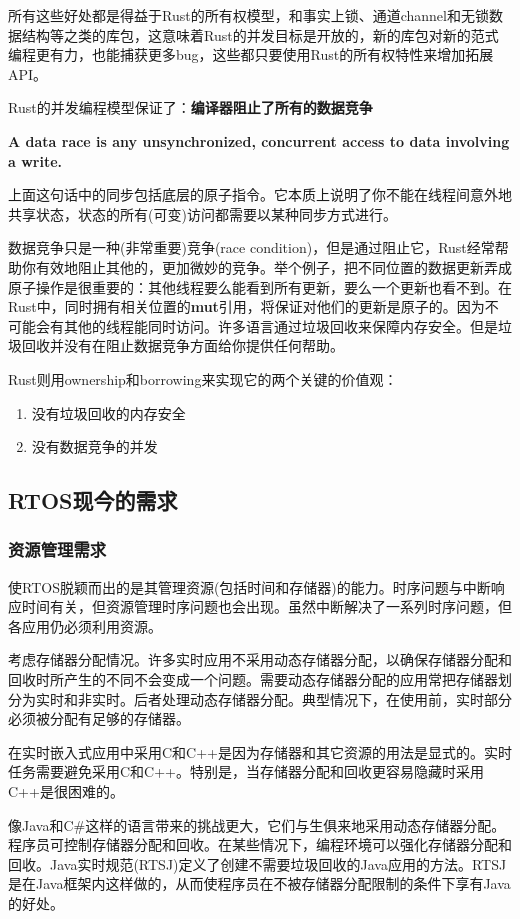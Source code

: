 \documentclass[12pt, a4paper]{article}
\begin{document}
	所有这些好处都是得益于Rust的所有权模型，和事实上锁、通道channel和无锁数据结构等之类的库包，这意味着Rust的并发目标是开放的，新的库包对新的范式编程更有力，也能捕获更多bug，这些都只要使用Rust的所有权特性来增加拓展API。
	
	Rust的并发编程模型保证了：\textbf{编译器阻止了所有的数据竞争}
	
	\textbf{A data race is any unsynchronized, concurrent access to data involving a write.}
	
	上面这句话中的同步包括底层的原子指令。它本质上说明了你不能在线程间意外地共享状态，状态的所有(可变)访问都需要以某种同步方式进行。
	
	数据竞争只是一种(非常重要)竞争(race condition)，但是通过阻止它，Rust经常帮助你有效地阻止其他的，更加微妙的竞争。举个例子，把不同位置的数据更新弄成原子操作是很重要的：其他线程要么能看到所有更新，要么一个更新也看不到。在Rust中，同时拥有相关位置的\textbf{mut}引用，将保证对他们的更新是原子的。因为不可能会有其他的线程能同时访问。许多语言通过垃圾回收来保障内存安全。但是垃圾回收并没有在阻止数据竞争方面给你提供任何帮助。
	
	Rust则用ownership和borrowing来实现它的两个关键的价值观：
	\begin{enumerate}
	\item  没有垃圾回收的内存安全
	\item  没有数据竞争的并发
	\end{enumerate}

	\subsection{RTOS现今的需求}
	\subsubsection{资源管理需求}
	使RTOS脱颖而出的是其管理资源(包括时间和存储器)的能力。时序问题与中断响应时间有关，但资源管理时序问题也会出现。虽然中断解决了一系列时序问题，但各应用仍必须利用资源。
	
	考虑存储器分配情况。许多实时应用不采用动态存储器分配，以确保存储器分配和回收时所产生的不同不会变成一个问题。需要动态存储器分配的应用常把存储器划分为实时和非实时。后者处理动态存储器分配。典型情况下，在使用前，实时部分必须被分配有足够的存储器。
	
	在实时嵌入式应用中采用C和C++是因为存储器和其它资源的用法是显式的。实时任务需要避免采用C和C++。特别是，当存储器分配和回收更容易隐藏时采用C++是很困难的。
	
	像Java和C\#这样的语言带来的挑战更大，它们与生俱来地采用动态存储器分配。程序员可控制存储器分配和回收。在某些情况下，编程环境可以强化存储器分配和回收。Java实时规范(RTSJ)定义了创建不需要垃圾回收的Java应用的方法。RTSJ是在Java框架内这样做的，从而使程序员在不被存储器分配限制的条件下享有Java的好处。
	
\end{document}
